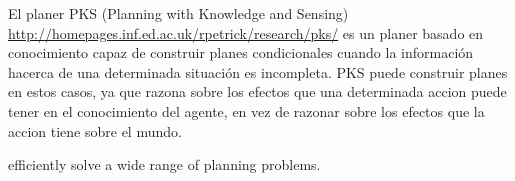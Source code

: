 



El planer PKS (Planning with Knowledge and Sensing) \url{http://homepages.inf.ed.ac.uk/rpetrick/research/pks/}
es un planer basado en conocimiento capaz de construir planes
condicionales cuando la informaci\'on hacerca de una determinada
situaci\'on es incompleta.  PKS puede construir planes en
estos casos, ya que razona sobre los efectos que una determinada
accion puede tener en el conocimiento del agente, en vez de
razonar sobre los efectos que la accion tiene sobre el mundo.

efficiently solve a wide range of planning problems.